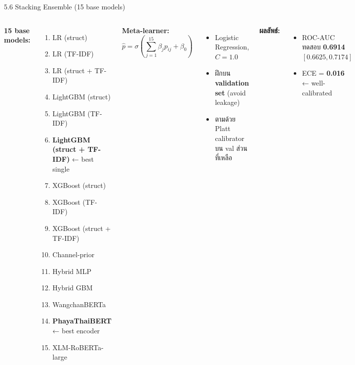 \documentclass[aspectratio=169,11pt,xcolor=dvipsnames]{beamer}
\newcommand{\hl}[1]{\textcolor{kmitlOrange}{\textbf{#1}}}
\begin{document}
\begin{frame}{5.6 Stacking Ensemble (15 base models)}
  \begin{columns}[T]
    \footnotesize
    \textbf{15 base models:}
    \begin{enumerate}\setlength\itemsep{0pt}
      \item LR (struct)
      \item LR (TF-IDF)
      \item LR (struct + TF-IDF)
      \item LightGBM (struct)
      \item LightGBM (TF-IDF)
      \item \hl{LightGBM (struct + TF-IDF)} ← best single
      \item XGBoost (struct)
      \item XGBoost (TF-IDF)
      \item XGBoost (struct + TF-IDF)
      \item Channel-prior
      \item Hybrid MLP
      \item Hybrid GBM
      \item WangchanBERTa
      \item \hl{PhayaThaiBERT} ← best encoder
      \item XLM-RoBERTa-large
    \end{enumerate}
    \textbf{Meta-learner:}
    \[
      \hat p = \sigma\!\left(\sum_{j=1}^{15} \beta_j p_{ij} + \beta_0\right)
    \]
    \begin{itemize}
      \item Logistic Regression, $C = 1.0$
      \item ฝึกบน \hl{validation set} (avoid leakage)
      \item ตามด้วย Platt calibrator บน val ส่วนที่เหลือ
    \end{itemize}
    \vspace{0.4em}
    \textbf{ผลลัพธ์:}
    \begin{itemize}
      \item ROC-AUC ทดสอบ \hl{0.6914}\\
        $[0.6625, 0.7174]$
      \item ECE = \hl{0.016} ← well-calibrated
    \end{itemize}
  \end{columns}
\end{frame}

\end{document}
